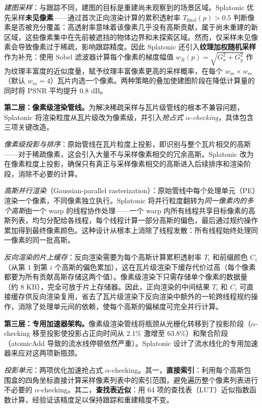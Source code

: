 \emph{建图采样}：与跟踪不同，建图的目标是重建尚未观察到的场景区域。Splatonic 优先采样\textbf{未见像素}——通过首次正向渲染计算的累积透射率 $T_{\mathrm{final}}(p) > 0.5$ 判断像素是否被充分覆盖：高透射率意味着该像素几乎没有高斯贡献，属于尚未重建的新区域，这些像素集中在先前被遮挡的物体边界和未探索区域。然而，仅采样未见像素会导致像素过于稀疏，影响跟踪精度。因此 Splatonic 还引入\textbf{纹理加权随机采样}作为补充：使用 Sobel 滤波器计算每个像素的梯度幅值 $w_R(p) = \sqrt{G_x^2 + G_y^2}$ 作为纹理丰富度的近似度量，赋予纹理丰富像素更高的采样概率，在每个 $w_m \times w_m$（默认 $w_m=4$）瓦片内选一个像素。两种策略的叠加使建图阶段在降低计算量的同时将 PSNR 平均提升 0.8 dB。

\textbf{第二层：像素级渲染管线。}为解决稀疏采样与瓦片级管线的根本不兼容问题，Splatonic 将渲染粒度从瓦片级改为像素级，并引入\emph{抢占式 $\alpha$-checking}，具体包含三项关键改造。

\emph{像素级投影与排序}：原始管线在瓦片粒度上投影，即识别与整个瓦片相交的高斯——对于稀疏像素，这会引入大量不与采样像素相交的冗余高斯。Splatonic 改为在像素粒度上投影，确保只有真正与采样像素相交的高斯进入后续排序和渲染阶段，消除不必要的计算。

\emph{高斯并行渲染}（Gaussian-parallel rasterization）：原始管线中每个处理单元（PE）渲染一个像素，不同像素独立执行。Splatonic 将并行粒度翻转为\emph{同一像素内的多个高斯}由一个 warp 的线程协作处理——一个 warp 内所有线程共享目标像素的高斯列表，均匀分配给各线程，每个线程计算一部分高斯的偏色，最后通过规约操作累加得到最终像素颜色。这种设计从根本上消除了线程发散：所有线程始终处理同一像素的同一批高斯。

\emph{反向渲染的片上缓存}：反向渲染需要为每个高斯计算累积透射率 $T_i$ 和前缀颜色 $C_i$（从第 1 到第 $i$ 个高斯的偏色累加），这在瓦片级渲染下缓存代价过高（每个像素都要为所有贡献高斯存储这两个值）。像素级渲染下只需存储单个像素的数据量（约 8 KB），完全可放于片上存储器。因此，正向渲染的中间结果 $T_i$ 和 $C_i$ 可直接缓存供反向渲染复用，省去了瓦片级渲染下反向渲染中额外的一轮跨线程规约操作，消除了处理单元间的依赖，使每个高斯的偏梯度可完全并行计算。

\textbf{第三层：专用加速器架构。}像素级渲染管线将瓶颈从光栅化转移到了投影阶段（$\alpha$-checking 移至投影使投影占正向时间从 2.1\% 激增至 63.8\%）和聚合阶段（atomicAdd 导致的流水线停顿依然严重）。Splatonic 设计了流水线化的专用加速器来应对这两项新瓶颈。

\emph{投影单元}：两项优化加速抢占式 $\alpha$-checking。其一，\textbf{直接索引}：利用每个高斯包围盒的四角坐标直接计算采样像素列表中的索引范围，避免遍历整个像素列表进行不必要的 $\alpha$-checking。其二，\textbf{查找表近似}：用 64 项的查找表（LUT）近似指数函数计算，经验证该精度足以保持跟踪和重建精度不变。

